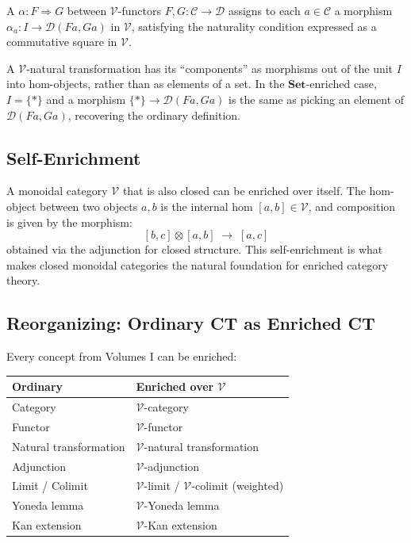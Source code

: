 \begin{definition}
A  $\alpha : F \Rightarrow G$ between
$\mathcal{V}$-functors $F, G : \mathcal{C} \to \mathcal{D}$ assigns to each
$a \in \mathcal{C}$ a morphism $\alpha_a : I \to \mathcal{D}(Fa, Ga)$ in $\mathcal{V}$,
satisfying the naturality condition expressed as a commutative square in $\mathcal{V}$.
\end{definition}

\begin{howtosay}
A $\mathcal{V}$-natural transformation has its ``components'' as morphisms out of
the unit $I$ into hom-objects, rather than as elements of a set. In the
$\mathbf{Set}$-enriched case, $I = \{*\}$ and a morphism $\{*\} \to \mathcal{D}(Fa, Ga)$
is the same as picking an element of $\mathcal{D}(Fa, Ga)$, recovering the ordinary
definition.
\end{howtosay}

\subsection{Self-Enrichment}

A monoidal category $\mathcal{V}$ that is also closed can be enriched over itself.
The hom-object between two objects $a, b$ is the internal hom $[a, b] \in \mathcal{V}$,
and composition is given by the morphism:
\[
  [b, c] \otimes [a, b] \;\to\; [a, c]
\]
obtained via the adjunction for closed structure. This self-enrichment is what
makes closed monoidal categories the natural foundation for enriched category theory.

\subsection{Reorganizing: Ordinary CT as Enriched CT}

Every concept from Volumes I can be enriched:

\begin{center}
\renewcommand{\arraystretch}{1.4}
\begin{tabular}{ll}
\hline
\textbf{Ordinary} & \textbf{Enriched over $\mathcal{V}$} \\
\hline
Category & $\mathcal{V}$-category \\
Functor & $\mathcal{V}$-functor \\
Natural transformation & $\mathcal{V}$-natural transformation \\
Adjunction & $\mathcal{V}$-adjunction \\
Limit / Colimit & $\mathcal{V}$-limit / $\mathcal{V}$-colimit (weighted) \\
Yoneda lemma & $\mathcal{V}$-Yoneda lemma \\
Kan extension & $\mathcal{V}$-Kan extension \\
\hline
\end{tabular}
\end{center}

